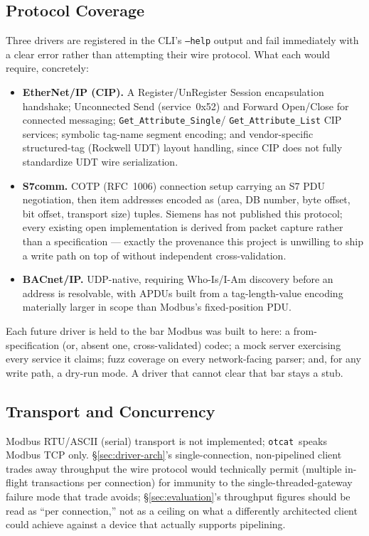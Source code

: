 \documentclass[10pt,conference]{IEEEtran}
\newcommand{\otcat}{\texttt{otcat}}
\newcommand{\code}[1]{\texttt{#1}}
\begin{document}
\subsection{Protocol Coverage}

Three drivers are registered in the CLI's \code{--help} output and
fail immediately with a clear error rather than attempting their wire
protocol. What each would require, concretely:

\begin{itemize}
\item \textbf{EtherNet/IP (CIP).} A Register/UnRegister Session
encapsulation handshake; Unconnected Send (service~0x52) and Forward
Open/Close for connected messaging; \code{Get\_Attribute\_Single}/
\code{Get\_Attribute\_List} CIP services; symbolic tag-name segment
encoding; and vendor-specific structured-tag (Rockwell UDT) layout
handling, since CIP does not fully standardize UDT wire serialization.
\item \textbf{S7comm.} COTP (RFC~1006) connection setup carrying an S7
PDU negotiation, then item addresses encoded as (area, DB number, byte
offset, bit offset, transport size) tuples. Siemens has not published
this protocol; every existing open implementation is derived from
packet capture rather than a specification --- exactly the provenance
this project is unwilling to ship a write path on top of without
independent cross-validation.
\item \textbf{BACnet/IP.} UDP-native, requiring Who-Is/I-Am discovery
before an address is resolvable, with APDUs built from a
tag-length-value encoding materially larger in scope than Modbus's
fixed-position PDU.
\end{itemize}

Each future driver is held to the bar Modbus was built to here: a
from-specification (or, absent one, cross-validated) codec; a mock
server exercising every service it claims; fuzz coverage on every
network-facing parser; and, for any write path, a dry-run mode. A
driver that cannot clear that bar stays a stub.

\subsection{Transport and Concurrency}

Modbus RTU/ASCII (serial) transport is not implemented; \otcat\ speaks
Modbus TCP only. \S\ref{sec:driver-arch}'s single-connection,
non-pipelined client trades away throughput the wire protocol would
technically permit (multiple in-flight transactions per connection)
for immunity to the single-threaded-gateway failure mode that
trade avoids; \S\ref{sec:evaluation}'s throughput figures should be
read as ``per connection,'' not as a ceiling on what a differently
architected client could achieve against a device that actually
supports pipelining.
\end{document}
